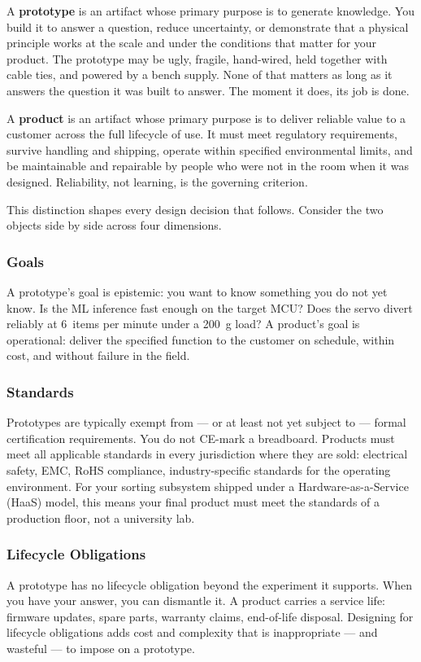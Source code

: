 A \textbf{prototype} is an artifact whose primary purpose is
to generate knowledge.
You build it to answer a question, reduce uncertainty, or demonstrate that a
physical principle works at the scale and under the conditions that matter for
your product.
The prototype may be ugly, fragile, hand-wired, held together with cable ties,
and powered by a bench supply.
None of that matters as long as it answers the question it was built to answer.
The moment it does, its job is done.

A \textbf{product} is an artifact whose primary purpose is to
deliver reliable value to a customer across the full lifecycle of use.
It must meet regulatory requirements, survive handling and shipping, operate
within specified environmental limits, and be maintainable and repairable by
people who were not in the room when it was designed.
Reliability, not learning, is the governing criterion.

This distinction shapes every design decision that follows.
Consider the two objects side by side across four dimensions.

\subsubsection{Goals}
A prototype's goal is epistemic: you want to know something you do not yet
know.
Is the ML inference fast enough on the target MCU?
Does the servo divert reliably at 6~items per minute under a 200~g load?
A product's goal is operational: deliver the specified function to the customer
on schedule, within cost, and without failure in the field.

\subsubsection{Standards}
Prototypes are typically exempt from --- or at least not yet subject to ---
formal certification requirements.
You do not CE-mark a breadboard.
Products must meet all applicable standards in every jurisdiction where they
are sold: electrical safety, EMC, RoHS compliance, industry-specific standards
for the operating environment.
For your sorting subsystem shipped under a Hardware-as-a-Service (HaaS) model,
this means your final product must meet the standards of a production floor,
not a university lab.

\subsubsection{Lifecycle Obligations}
A prototype has no lifecycle obligation beyond the experiment it supports.
When you have your answer, you can dismantle it.
A product carries a service life: firmware updates, spare parts, warranty
claims, end-of-life disposal.
Designing for lifecycle obligations adds cost and complexity that is
inappropriate --- and wasteful --- to impose on a prototype.

